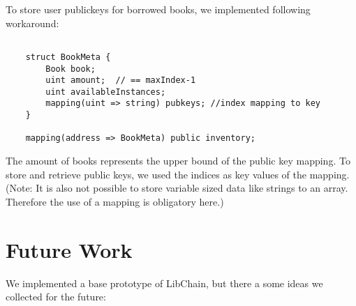 \begin{itemize}
To store user publickeys for borrowed books, we implemented following workaround:

\begin{minipage}{\linewidth}
\begin{lstlisting}

	struct BookMeta {
		Book book;
		uint amount;  // == maxIndex-1
		uint availableInstances;
		mapping(uint => string) pubkeys; //index mapping to key
	}

	mapping(address => BookMeta) public inventory;
\end{lstlisting}
\end{minipage}

The amount of books represents the upper bound of the public key mapping. To store and retrieve public keys, we used the indices as key values of the mapping.
(Note: It is also not possible to store variable sized data like strings to an array. Therefore the use of a mapping is obligatory here.)
\end{itemize}


\section{Future Work}
We implemented a base prototype of LibChain, but there a some ideas we collected for the future:

